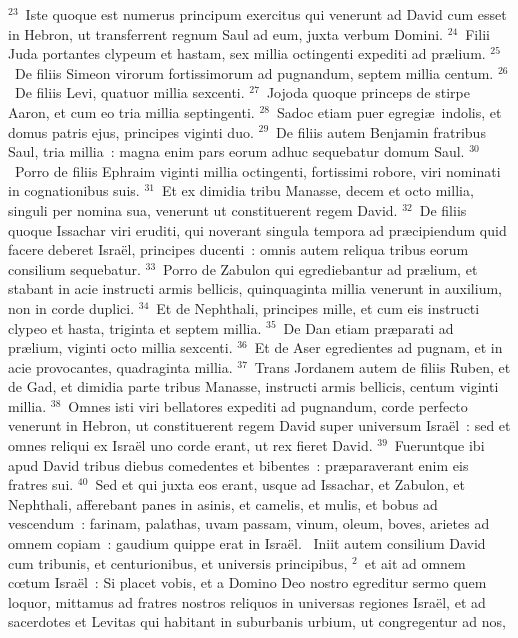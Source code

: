 ${}^{23}$~Iste quoque est numerus principum exercitus qui venerunt ad David cum esset in Hebron, ut transferrent regnum Saul ad eum, juxta verbum Domini.
${}^{24}$~Filii Juda portantes clypeum et hastam, sex millia octingenti expediti ad pr\ae lium.
${}^{25}$~De filiis Simeon virorum fortissimorum ad pugnandum, septem millia centum.
${}^{26}$~De filiis Levi, quatuor millia sexcenti.
${}^{27}$~Jojoda quoque princeps de stirpe Aaron, et cum eo tria millia septingenti.
${}^{28}$~Sadoc etiam puer egregi\ae\ indolis, et domus patris ejus, principes viginti duo.
${}^{29}$~De filiis autem Benjamin fratribus Saul, tria millia~: magna enim pars eorum adhuc sequebatur domum Saul.
${}^{30}$~Porro de filiis Ephraim viginti millia octingenti, fortissimi robore, viri nominati in cognationibus suis.
${}^{31}$~Et ex dimidia tribu Manasse, decem et octo millia, singuli per nomina sua, venerunt ut constituerent regem David.
${}^{32}$~De filiis quoque Issachar viri eruditi, qui noverant singula tempora ad pr\ae cipiendum quid facere deberet Isra\"el, principes ducenti~: omnis autem reliqua tribus eorum consilium sequebatur.
${}^{33}$~Porro de Zabulon qui egrediebantur ad pr\ae lium, et stabant in acie instructi armis bellicis, quinquaginta millia venerunt in auxilium, non in corde duplici.
${}^{34}$~Et de Nephthali, principes mille, et cum eis instructi clypeo et hasta, triginta et septem millia.
${}^{35}$~De Dan etiam pr\ae parati ad pr\ae lium, viginti octo millia sexcenti.
${}^{36}$~Et de Aser egredientes ad pugnam, et in acie provocantes, quadraginta millia.
${}^{37}$~Trans Jordanem autem de filiis Ruben, et de Gad, et dimidia parte tribus Manasse, instructi armis bellicis, centum viginti millia.
${}^{38}$~Omnes isti viri bellatores expediti ad pugnandum, corde perfecto venerunt in Hebron, ut constituerent regem David super universum Isra\"el~: sed et omnes reliqui ex Isra\"el uno corde erant, ut rex fieret David.
${}^{39}$~Fueruntque ibi apud David tribus diebus comedentes et bibentes~: pr\ae paraverant enim eis fratres sui.
${}^{40}$~Sed et qui juxta eos erant, usque ad Issachar, et Zabulon, et Nephthali, afferebant panes in asinis, et camelis, et mulis, et bobus ad vescendum~: farinam, palathas, uvam passam, vinum, oleum, boves, arietes ad omnem copiam~: gaudium quippe erat in Isra\"el.
~\lettrine[lines=10,image=true,loversize=0.05,lraise=-0.03]{I}{}niit autem consilium David cum tribunis, et centurionibus, et universis principibus,
${}^{2}$~et ait ad omnem cœtum Isra\"el~: Si placet vobis, et a Domino Deo nostro egreditur sermo quem loquor, mittamus ad fratres nostros reliquos in universas regiones Isra\"el, et ad sacerdotes et Levitas qui habitant in suburbanis urbium, ut congregentur ad nos,
